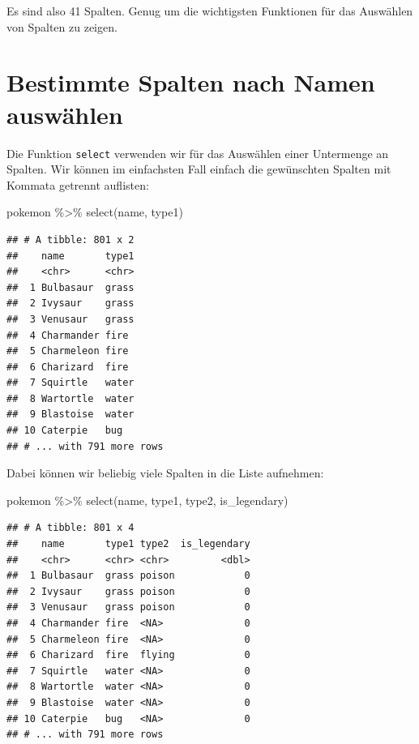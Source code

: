\documentclass[
]{book}
\newenvironment{Shaded}{\begin{snugshade}}{\end{snugshade}}
\newcommand{\FunctionTok}[1]{\textcolor[rgb]{0.00,0.00,0.00}{#1}}
\newcommand{\NormalTok}[1]{#1}
\newcommand{\SpecialCharTok}[1]{\textcolor[rgb]{0.00,0.00,0.00}{#1}}
\begin{document}
Es sind also 41 Spalten. Genug um die wichtigsten Funktionen für das Auswählen von Spalten zu zeigen.

\hypertarget{bestimmte-spalten-nach-namen-auswuxe4hlen}{%
\section{Bestimmte Spalten nach Namen auswählen}\label{bestimmte-spalten-nach-namen-auswuxe4hlen}}

Die Funktion \texttt{select} verwenden wir für das Auswählen einer Untermenge an Spalten. Wir können im einfachsten Fall einfach die gewünschten Spalten mit Kommata getrennt auflisten:

\begin{Shaded}
\begin{Highlighting}[]
\NormalTok{pokemon }\SpecialCharTok{\%\textgreater{}\%}
  \FunctionTok{select}\NormalTok{(name, type1)}
\end{Highlighting}
\end{Shaded}

\begin{verbatim}
## # A tibble: 801 x 2
##    name       type1
##    <chr>      <chr>
##  1 Bulbasaur  grass
##  2 Ivysaur    grass
##  3 Venusaur   grass
##  4 Charmander fire 
##  5 Charmeleon fire 
##  6 Charizard  fire 
##  7 Squirtle   water
##  8 Wartortle  water
##  9 Blastoise  water
## 10 Caterpie   bug  
## # ... with 791 more rows
\end{verbatim}

Dabei können wir beliebig viele Spalten in die Liste aufnehmen:

\begin{Shaded}
\begin{Highlighting}[]
\NormalTok{pokemon }\SpecialCharTok{\%\textgreater{}\%}
  \FunctionTok{select}\NormalTok{(name, type1, type2, is\_legendary)}
\end{Highlighting}
\end{Shaded}

\begin{verbatim}
## # A tibble: 801 x 4
##    name       type1 type2  is_legendary
##    <chr>      <chr> <chr>         <dbl>
##  1 Bulbasaur  grass poison            0
##  2 Ivysaur    grass poison            0
##  3 Venusaur   grass poison            0
##  4 Charmander fire  <NA>              0
##  5 Charmeleon fire  <NA>              0
##  6 Charizard  fire  flying            0
##  7 Squirtle   water <NA>              0
##  8 Wartortle  water <NA>              0
##  9 Blastoise  water <NA>              0
## 10 Caterpie   bug   <NA>              0
## # ... with 791 more rows
\end{verbatim}
\end{document}
